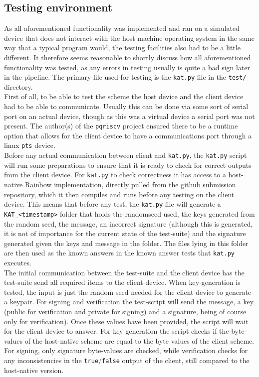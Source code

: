 \subsection{Testing environment}
As all aforementioned functionality was implemented and ran on a simulated device that does not interact with the host machine operating system in the same way that a typical program would, the testing facilities also had to be a little different. It therefore seems reasonable to shortly discuss how all aforementioned functionality was tested, as any errors in testing usually is quite a bad sign later in the pipeline. The primary file used for testing is the \texttt{kat.py} file in the \texttt{test/} directory.\medskip\\
First of all, to be able to test the scheme the host device and the client device had to be able to communicate. Usually this can be done via some sort of serial port on an actual device, though as this was a virtual device a serial port was not present. The author(s) of the \texttt{pqriscv} project ensured there to be a runtime option that allows for the client device to have a communications port through a linux \texttt{pts} device.\medskip\\
Before any actual communication between client and \texttt{kat.py}, the \texttt{kat.py} script will run some preparations to ensure that it is ready to check for correct outputs from the client device. For \texttt{kat.py} to check correctness it has access to a host-native Rainbow implementation, directly pulled from the github submission repository, which it then compiles and runs before any testing on the client device. This means that before any test, the \texttt{kat.py} file will generate a \texttt{KAT\_<timestamp>} folder that holds the randomseed used, the keys generated from the random seed, the message, an incorrect signature (although this is generated, it is not of importance for the current state of the test-suite) and the signature generated given the keys and message in the folder. The files lying in this folder are then used as the known answers in the known answer tests that \texttt{kat.py} executes.\medskip\\
The initial communication between the test-suite and the client device has the test-suite send all required items to the client device. When key-generation is tested, the input is just the random seed needed for the client device to generate a keypair. For signing and verification the test-script will send the message, a key (public for verification and private for signing) and a signature, being of course only for verification). Once these values have been provided, the script will wait for the client device to answer. For key generation the script checks if the byte-values of the host-native scheme are equal to the byte values of the client scheme. For signing, only signature byte-values are checked, while verification checks for any inconsistencies in the \texttt{true}/\texttt{false} output of the client, still compared to the host-native version.

